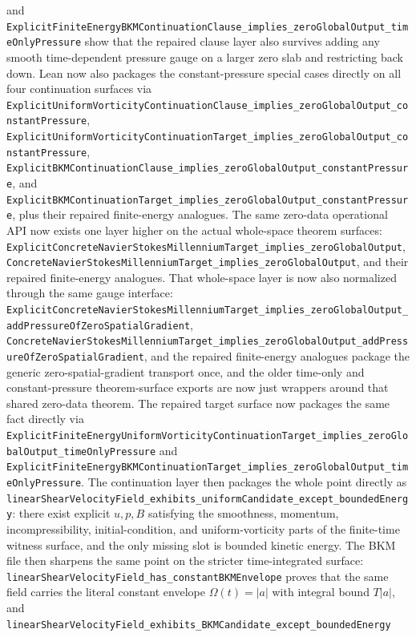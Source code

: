 \documentclass[11pt]{article}
\begin{document}
and
\texttt{ExplicitFiniteEnergyBKMContinuationClause\_implies\_zeroGlobalOutput\_timeOnlyPressure}
show that the repaired clause layer also survives adding any smooth
time-dependent pressure gauge on a larger zero slab and restricting back down.
Lean now also packages the constant-pressure special cases directly on all four
continuation surfaces via
\texttt{ExplicitUniformVorticityContinuationClause\_implies\_zeroGlobalOutput\_constantPressure},
\texttt{ExplicitUniformVorticityContinuationTarget\_implies\_zeroGlobalOutput\_constantPressure},
\texttt{ExplicitBKMContinuationClause\_implies\_zeroGlobalOutput\_constantPressure},
and
\texttt{ExplicitBKMContinuationTarget\_implies\_zeroGlobalOutput\_constantPressure},
plus their repaired finite-energy analogues.
The same zero-data operational API now exists one layer higher on the actual
whole-space theorem surfaces:
\texttt{ExplicitConcreteNavierStokesMillenniumTarget\_implies\_zeroGlobalOutput},
\texttt{ConcreteNavierStokesMillenniumTarget\_implies\_zeroGlobalOutput}, and
their repaired finite-energy analogues.  That whole-space layer is now also
normalized through the same gauge interface:
\texttt{ExplicitConcreteNavierStokesMillenniumTarget\_implies\_zeroGlobalOutput\_addPressureOfZeroSpatialGradient},
\texttt{ConcreteNavierStokesMillenniumTarget\_implies\_zeroGlobalOutput\_addPressureOfZeroSpatialGradient},
and the repaired finite-energy analogues package the generic
zero-spatial-gradient transport once, and the older time-only and
constant-pressure theorem-surface exports are now just wrappers around that
shared zero-data theorem.
The repaired target surface now packages the same fact directly via
\texttt{ExplicitFiniteEnergyUniformVorticityContinuationTarget\_implies\_zeroGlobalOutput\_timeOnlyPressure}
and
\texttt{ExplicitFiniteEnergyBKMContinuationTarget\_implies\_zeroGlobalOutput\_timeOnlyPressure}.
The continuation layer then
packages the whole point directly as
\texttt{linearShearVelocityField\_exhibits\_uniformCandidate\_except\_boundedEnergy}:
there exist explicit \(u,p,B\) satisfying the smoothness, momentum,
incompressibility, initial-condition, and uniform-vorticity parts of the
finite-time witness surface, and the only missing slot is bounded kinetic
energy.  The BKM file then sharpens the same point on the stricter
time-integrated surface:
\texttt{linearShearVelocityField\_has\_constantBKMEnvelope} proves that the same
field carries the literal constant envelope \(\Omega(t)=|a|\) with integral
bound \(T|a|\), and
\texttt{linearShearVelocityField\_exhibits\_BKMCandidate\_except\_boundedEnergy}
\end{document}
